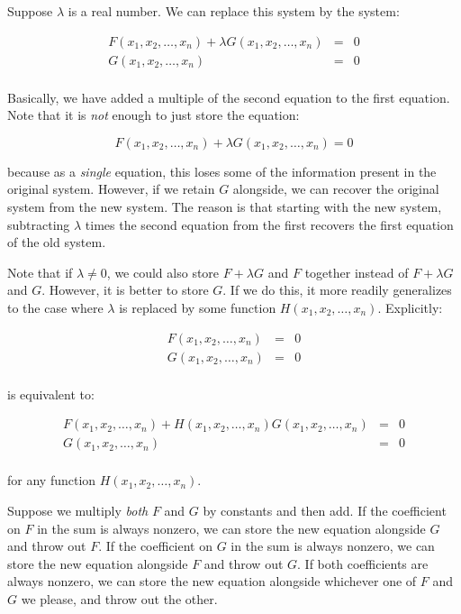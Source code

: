 \documentclass[10pt]{amsart}
\begin{document}
Suppose $\lambda$ is a real number. We can replace this system by the system:

\begin{eqnarray*}
  F(x_1,x_2,\dots,x_n) + \lambda G(x_1,x_2,\dots,x_n) & = & 0\\
  G(x_1,x_2,\dots,x_n) & = & 0\\
\end{eqnarray*}

Basically, we have added a multiple of the second equation to the
first equation. Note that it is {\em not} enough to just store the
equation:

$$ F(x_1,x_2,\dots,x_n) + \lambda G(x_1,x_2,\dots,x_n)  =  0$$

because as a {\em single} equation, this loses some of the information
present in the original system. However, if we retain $G$ alongside,
we can recover the original system from the new system. The reason is
that starting with the new system, subtracting $\lambda$ times the
second equation from the first recovers the first equation of the old
system.

Note that if $\lambda \ne 0$, we could also store $F + \lambda G$ and
$F$ together instead of $F + \lambda G$ and $G$. However, it is better
to store $G$. If we do this, it more readily generalizes to the case
where $\lambda$ is replaced by some function
$H(x_1,x_2,\dots,x_n)$. Explicitly:

\begin{eqnarray*}
  F(x_1,x_2,\dots,x_n) & = & 0\\
  G(x_1,x_2,\dots,x_n) & = & 0\\
\end{eqnarray*}

is equivalent to:

\begin{eqnarray*}
  F(x_1,x_2,\dots,x_n) + H(x_1,x_2,\dots,x_n)G(x_1,x_2,\dots,x_n) & = & 0\\
  G(x_1,x_2,\dots,x_n) & = & 0\\
\end{eqnarray*}

for any function $H(x_1,x_2,\dots,x_n)$.

Suppose we multiply {\em both} $F$ and $G$ by constants and then
add. If the coefficient on $F$ in the sum is always nonzero, we can
store the new equation alongside $G$ and throw out $F$. If the
coefficient on $G$ in the sum is always nonzero, we can store the new
equation alongside $F$ and throw out $G$. If both coefficients are
always nonzero, we can store the new equation alongside whichever one
of $F$ and $G$ we please, and throw out the other.
\end{document}
